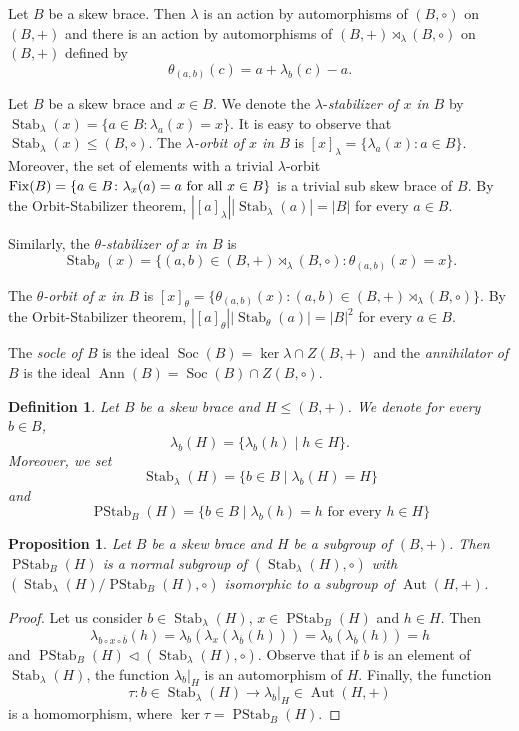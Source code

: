 \documentclass{amsart}
\newcommand{\Aut}{\operatorname{Aut}}
\newcommand{\Ann}{\operatorname{Ann}}
\newcommand{\Soc}{\operatorname{Soc}}
\newcommand{\Fix}{\operatorname{Fix}}
\newcommand{\Stab}{\operatorname{Stab}}
\newcommand{\PStab}{\operatorname{PStab}}
\newtheorem{pro}[thm]{Proposition}
\newtheorem{defn}[thm]{Definition}
\begin{document}
 Let $B$ be a skew brace. Then
 $\lambda$ is an action by automorphisms of $(B,\circ)$ on $(B,+)$ 
and there is an action by automorphisms of $(B,+)\rtimes_{\lambda} (B,\circ)$ on $(B,+)$ defined by 
\[
\theta_{(a,b)}(c)=a+\lambda_b(c)-a.
\]


Let $B$ be a skew brace and $x\in B$. We denote the $\lambda$-\emph{stabilizer of $x$ in $B$} by $\Stab_\lambda(x)=\{a\in B\colon \lambda_a(x)=x\}$.  It is easy to observe that $\Stab_\lambda(x)\leq (B,\circ)$. 
The \emph{$\lambda$-orbit of $x$ in $B$} is $[x]_\lambda=\{\lambda_a(x)\colon a\in B\}$.
Moreover, the set of elements with a trivial $\lambda$-orbit $\Fix(B)=\{a\in B\colon \lambda_x(a)=a \textnormal{ for all } x\in B\}$ is a trivial sub skew brace of $B$.
By the Orbit-Stabilizer theorem, $\left|[a]_\lambda\right|\left|\Stab_\lambda(a)\right|=|B|$ for every $a\in B$.   

 Similarly, the \emph{$\theta$-stabilizer of $x$ in $B$} 
is 
\[
\Stab_\theta(x)=\{(a,b)\in (B,+)\rtimes_{\lambda} (B,\circ)\colon \theta_{(a,b)}(x)=x\}.
\]

The \emph{$\theta$-orbit of $x$ in $B$} is $[x]_\theta=\{\theta_{(a,b)}(x) \colon (a,b)\in (B,+)\rtimes_{\lambda} (B,\circ)\}$.
By the Orbit-Stabilizer theorem, $\left|[a]_\theta\right|\left|\Stab_\theta(a)\right|=|B|^2$ for every $a\in B$.

The \emph{socle of $B$} is the ideal $\Soc(B)=\ker\lambda\cap Z(B,+)$ and 
the \emph{annihilator of $B$} is the ideal $\Ann(B)=\Soc(B)\cap Z(B,\circ)$.

\begin{defn}
Let $B$ be a skew brace and $H\leq (B,+)$. We denote for every $b\in B$,
\[
\lambda_b(H)=\{\lambda_b(h)\mid h\in H\}.
\]
Moreover, we set 
\[
\Stab_\lambda(H)=\{b\in B\mid \lambda_b(H)=H\}
\]
and
\[
\PStab_B(H)=\{b\in B\mid \lambda_b(h)=h\text{ for every }h\in H\}
\]   

\end{defn}


\begin{pro}\label{quotient}
Let $B$ be a skew brace and $H$ be a subgroup of $(B,+)$.
Then $\PStab_B(H)$ is a normal subgroup of $(\Stab_\lambda(H),\circ)$ with $(\Stab_\lambda(H)/\PStab_B(H),\circ)$ isomorphic to a subgroup of $\Aut(H,+)$.
\end{pro}

 
\begin{proof}
    Let us consider $b\in \Stab_\lambda(H)$, $x\in \PStab_B(H)$ and $h\in H$.
    Then 
    \[
    \lambda_{b\circ x\circ \overline{b}}(h)=\lambda_{b}(\lambda_x(\lambda_{\overline{b}}(h)))=\lambda_{b}(\lambda_{\overline{b}}(h))=h
    \]
    and $\PStab_B(H)\lhd (\Stab_\lambda(H),\circ)$. Observe that if $b$ is an element of $\Stab_\lambda(H)$, the function $\lambda_b\big|_H$ is an automorphism of $H$. Finally, the function $$\tau:b\in \Stab_\lambda(H)\to \lambda_b\big|_H\in \Aut(H,+)$$ is a homomorphism, where $\ker \tau=\PStab_B(H)$. 
\end{proof}
\end{document}

